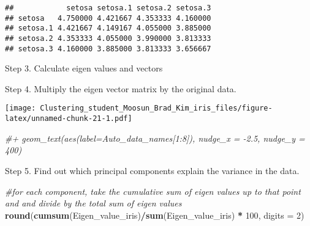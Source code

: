 \documentclass[11pt,]{article}
\newenvironment{Shaded}{\begin{snugshade}}{\end{snugshade}}
\newcommand{\CommentTok}[1]{\textcolor[rgb]{0.56,0.35,0.01}{\textit{#1}}}
\newcommand{\DataTypeTok}[1]{\textcolor[rgb]{0.13,0.29,0.53}{#1}}
\newcommand{\DecValTok}[1]{\textcolor[rgb]{0.00,0.00,0.81}{#1}}
\newcommand{\KeywordTok}[1]{\textcolor[rgb]{0.13,0.29,0.53}{\textbf{#1}}}
\newcommand{\NormalTok}[1]{#1}
\newcommand{\OperatorTok}[1]{\textcolor[rgb]{0.81,0.36,0.00}{\textbf{#1}}}
\newcommand{\StringTok}[1]{\textcolor[rgb]{0.31,0.60,0.02}{#1}}
\begin{document}
\begin{verbatim}
##            setosa setosa.1 setosa.2 setosa.3
## setosa   4.750000 4.421667 4.353333 4.160000
## setosa.1 4.421667 4.149167 4.055000 3.885000
## setosa.2 4.353333 4.055000 3.990000 3.813333
## setosa.3 4.160000 3.885000 3.813333 3.656667
\end{verbatim}

Step 3. Calculate eigen values and vectors

\begin{Shaded}
\end{Shaded}

Step 4. Multiply the eigen vector matrix by the original data.

\begin{Shaded}
\end{Shaded}

\texttt{[image: Clustering\_student\_Moosun\_Brad\_Kim\_iris\_files/figure-latex/unnamed-chunk-21-1.pdf]}

\begin{Shaded}
\begin{Highlighting}[]
\CommentTok{#+ geom_text(aes(label=Auto_data_names[1:8]), nudge_x = -2.5, nudge_y = 400)}
\end{Highlighting}
\end{Shaded}

Step 5. Find out which principal components explain the variance in the
data.

\begin{Shaded}
\begin{Highlighting}[]
\CommentTok{#for each component, take the cumulative sum of eigen values up to that point and and divide by the total sum of eigen values}
\KeywordTok{round}\NormalTok{(}\KeywordTok{cumsum}\NormalTok{(Eigen_value_iris)}\OperatorTok{/}\KeywordTok{sum}\NormalTok{(Eigen_value_iris) }\OperatorTok{*}\StringTok{ }\DecValTok{100}\NormalTok{, }\DataTypeTok{digits =} \DecValTok{2}\NormalTok{)}
\end{Highlighting}
\end{Shaded}
\end{document}
